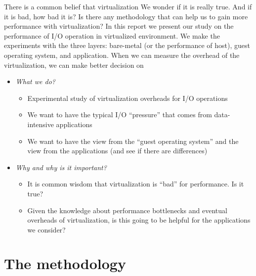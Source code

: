\documentclass{acmsig}
\begin{document}
There is a common belief that virtualization
We wonder if it is really true. And if it is bad, how bad it is? Is there any methodology that can help us to gain more performance with virtualization? In this report we present our study on the performance of I/O operation in virtualized environment. We make the experiments with the three layers: bare-metal (or the performance of host), guest operating system, and application.
When we can measure the overhead of the virtualization, we can make better decision on
\begin{itemize}
  \item \textit{What we do?}
  \begin{itemize}
    \item Experimental study of virtualization overheads for I/O operations
    \item We want to have the typical I/O ``pressure'' that comes from data-intensive applications
    \item We want to have the view from the ``guest operating system'' and the view from the applications (and see if there are differences)
  \end{itemize}
  \item \textit{Why and why is it important?}
  \begin{itemize}
    \item It is common wisdom that virtualization is ``bad'' for performance. Is it true?
    \item Given the knowledge about performance bottlenecks and eventual overheads of virtualization, is this going to be helpful for the applications we consider?
  \end{itemize}
\end{itemize}

\section{The methodology}
\end{document}

